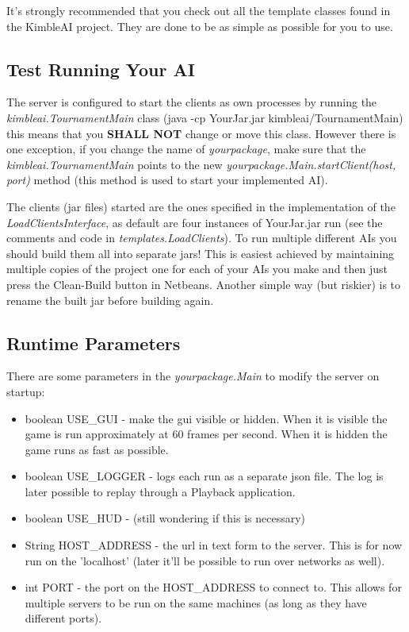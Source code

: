 \documentclass[10pt,a4paper]{article}
\begin{document}
It's strongly recommended that you check out all the template classes found in the KimbleAI project. They are done to be as simple as possible for you to use.

\subsection{Test Running Your AI}

The server is configured to start the clients as own processes by running the \textit{kimbleai.TournamentMain} class (java -cp YourJar.jar kimbleai/TournamentMain) this means that you \textbf{SHALL NOT} change or move this class. However there is one exception, if you change the name of \textit{yourpackage}, make sure that the \textit{kimbleai.TournamentMain} points to the new \textit{yourpackage.Main.startClient(host, port)} method (this method is used to start your implemented AI).

The clients (jar files) started are the ones specified in the implementation of the \textit{LoadClientsInterface}, as default are four instances of YourJar.jar run (see the comments and code in \textit{templates.LoadClients}). To run multiple different AIs you should build them all into separate jars! This is easiest achieved by maintaining multiple copies of the project one for each of your AIs you make and then just press the Clean-Build button in Netbeans. Another simple way (but riskier) is to rename the built jar before building again.


\subsection{Runtime Parameters}

There are some parameters in the \textit{yourpackage.Main} to modify the server on startup:
\begin{itemize}

\item boolean USE\_GUI - make the gui visible or hidden. When it is visible the game is run approximately at 60 frames per second. When it is hidden the game runs as fast as possible.

\item boolean USE\_LOGGER - logs each run as a separate json file. The log is later possible to replay through a Playback application.

\item boolean USE\_HUD - (still wondering if this is necessary)

\item String HOST\_ADDRESS - the url in text form to the server. This is for now run on the 'localhost' (later it'll be possible to run over networks as well).

\item int PORT - the port on the HOST\_ADDRESS to connect to. This allows for multiple servers to be run on the same machines (as long as they have different ports).

\end{itemize}
\end{document}

